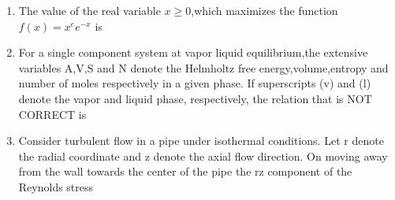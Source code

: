 \documentclass[journal]{IEEEtran}
\numberwithin{equation}{enumi}
\numberwithin{figure}{enumi}
\begin{document}
\begin{enumerate}[start=1, label={Q\arabic*.}]
\begin{enumerate}
\end{enumerate}
\item The value of the real variable $x\geq0$,which maximizes the function $f(x)=x^e e^{-x}$ is
\begin{enumerate}
\end{enumerate}
\item For a single component system at vapor liquid equilibrium,the extensive variables A,V,S and N denote the Helmholtz free energy,volume,entropy and number of moles respectively in a given phase. If superscripts (v) and (l) denote the vapor and liquid phase, respectively, the relation that is NOT CORRECT is
\begin{enumerate} 
  \end{enumerate}
  \item Consider turbulent flow in a pipe under isothermal conditions. Let r denote the radial coordinate and z denote the axial flow direction. On moving away from the wall towards the center of the pipe the rz component of the Reynolds stress
  \begin{enumerate} 
\end{enumerate}
\end{enumerate}
\end{document}

